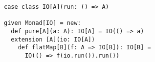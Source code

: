 \begin{algorithm}

\begin{verbatim}
case class IO[A](run: () => A)

given Monad[IO] = new:
  def pure[A](a: A): IO[A] = IO(() => a)
  extension [A](io: IO[A])
    def flatMap[B](f: A => IO[B]): IO[B] =
      IO(() => f(io.run()).run())
\end{verbatim}

\caption{Naive IO monad in Scala. %
\label{monad:io}}
\end{algorithm}